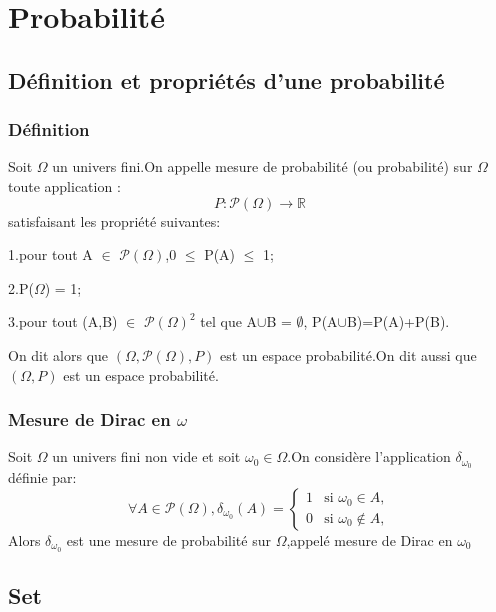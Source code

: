 \documentclass[12pt]{book}
\theoremstyle{definition}\newtheorem{dfn}{Définition}[chapter]
\theoremstyle{plain}\newtheorem{thm}{Théorème}[chapter]
\theoremstyle{plain}\newtheorem{prp}{Proposition}[chapter]
\theoremstyle{plain}\newtheorem{lem}{\bf Lemme}[chapter]
\theoremstyle{plain}\newtheorem{axm}{\bf Axiome}[chapter]
\theoremstyle{plain}\newtheorem{lmm}{\bf Lemme}[chapter]
\theoremstyle{plain}\newtheorem{cor}{\bf Corollaire}[chapter]
\theoremstyle{remark}\newtheorem{rem}{Remarque}[chapter]
\begin{document}
\chapter{Probabilité}
\section{Définition et propriétés d'une probabilité }%
\subsection{Définition}
Soit $\varOmega$ un univers fini.On appelle mesure de probabilité (ou probabilité)
sur $\varOmega$ toute application :
\begin{equation*}
P:\mathcal{P(\varOmega)}\longrightarrow\mathbb{R}
\end{equation*}
satisfaisant les propriété suivantes:

1.pour tout A $\in$ $\mathcal{P(\varOmega)}$,0 $\leqslant$ P(A) $\leqslant$ 1;


2.P($\varOmega$) = 1;

3.pour tout (A,B) $\in$ $\mathcal{P(\varOmega)}^2$ tel que A$\cup$B = $\emptyset$, P(A$\cup  $B)=P(A)+P(B).

On dit alors que $(\varOmega,\mathcal{P(\varOmega)},P)$ est un espace probabilité.On dit aussi que $(\varOmega,P)$  est un espace probabilité.
\subsection{Mesure de Dirac en $\omega$}
Soit $\varOmega$ un univers fini non vide et soit $\omega_0 \in \varOmega$.On considère l'application $\delta_{\omega_0}$ définie par:
\begin{equation*}
\forall A \in \mathcal{P(\varOmega)},  \delta_{\omega_0}(A) = \begin{cases}
1 & \text{si }\omega_0 \in A ,\\
0 & \text{si }\omega_0 \notin A ,
\end{cases}
\end{equation*}
Alors $\delta_{\omega_0}$ est une mesure de probabilité sur $\varOmega$,appelé mesure de Dirac en $\omega_0$




\section{Set}
\end{document}
